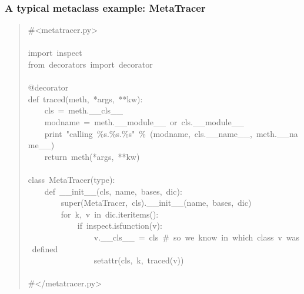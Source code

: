 \documentclass[10pt,a4paper,english]{article}
\begin{document}

\hypertarget{a-typical-metaclass-example-metatracer}{}
\subsubsection*{A typical metaclass example: MetaTracer}
\begin{quote}{\ttfamily \raggedright \noindent
{\#}<metatracer.py>~\\
~\\
import~inspect~\\
from~decorators~import~decorator~\\
~\\
@decorator~\\
def~traced(meth,~*args,~**kw):~\\
~~~~cls~=~meth.{\_}{\_}cls{\_}{\_}~\\
~~~~modname~=~meth.{\_}{\_}module{\_}{\_}~or~cls.{\_}{\_}module{\_}{\_}~\\
~~~~print~"calling~{\%}s.{\%}s.{\%}s"~{\%}~(modname,~cls.{\_}{\_}name{\_}{\_},~meth.{\_}{\_}name{\_}{\_})~\\
~~~~return~meth(*args,~**kw)~\\
~\\
class~MetaTracer(type):~~~~~~~~~~~~~\\
~~~~def~{\_}{\_}init{\_}{\_}(cls,~name,~bases,~dic):~\\
~~~~~~~~super(MetaTracer,~cls).{\_}{\_}init{\_}{\_}(name,~bases,~dic)~\\
~~~~~~~~for~k,~v~in~dic.iteritems():~\\
~~~~~~~~~~~~if~inspect.isfunction(v):~\\
~~~~~~~~~~~~~~~~v.{\_}{\_}cls{\_}{\_}~=~cls~{\#}~so~we~know~in~which~class~v~was~defined~\\
~~~~~~~~~~~~~~~~setattr(cls,~k,~traced(v))~\\
~\\
{\#}</metatracer.py>
}\end{quote}
\end{document}
